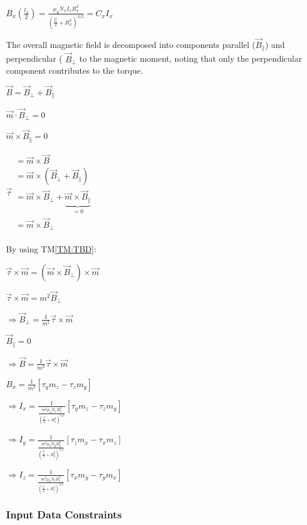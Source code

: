 \documentclass[12pt]{article}
\newcommand{\tref}[1]{TM\ref{#1}}
\begin{document}
$B_x\left( \frac{l_x}{2} \right) =\frac{\mu _0N_xI_xR_{x}^{2}}{\left( \frac{l_{x}^{2}}{4}+R_{x}^{2} \right) ^{3/2}}=C_xI_x$

The overall magnetic field is decomposed into components parallel ($\vec{B}_{\parallel}$) and perpendicular ( $\vec{B}_{\bot}$ to the magnetic moment, noting that only the perpendicular component contributes to the torque. 

$\vec{B}=\vec{B}_{\bot}+\vec{B}_{\parallel}$

$\vec{m}\cdot \vec{B}_{\bot}=0$

$\vec{m}\times \vec{B}_{\parallel}=0$

$\vec{\tau}\begin{array}{l}
 =\vec{m}\times \vec{B}\\
 =\vec{m}\times \left( \vec{B}_{\bot}+\vec{B}_{\parallel} \right)\\
 =\vec{m}\times \vec{B}_{\bot}+\underset{=0}{\underbrace{\vec{m}\times \vec{B}_{\parallel}}}\\
 =\vec{m}\times \vec{B}_{\bot}\\
\end{array}$

By using \tref{TM:TBD}:

$\vec{\tau}\times \vec{m}=\left( \vec{m}\times \vec{B}_{\bot} \right) \times \vec{m}$

$\vec{\tau}\times \vec{m}=m^2\vec{B}_{\bot}$

$\Rightarrow \vec{B}_{\bot}=\frac{1}{m^2}\vec{\tau}\times \vec{m}$

$\vec{B}_{\parallel}=0$

$\Rightarrow \vec{B}=\frac{1}{m^2}\vec{\tau}\times \vec{m}$

$B_x=\frac{1}{m^2}\left[ \tau _ym_z-\tau _zm_y \right] $

$\Rightarrow I_x=\frac{1}{\frac{m^2\mu _0N_xR_{x}^{2}}{\left( \frac{l_{x}^{2}}{4}+R_{x}^{2} \right) ^{3/2}}}\left[ \tau _ym_z-\tau _zm_y \right] $

$\Rightarrow I_y=\frac{1}{\frac{m^2\mu _0N_yR_{y}^{2}}{\left( \frac{l_{y}^{2}}{4}+R_{y}^{2} \right) ^{3/2}}}\left[ \tau _zm_x-\tau _xm_z \right] $

$\Rightarrow I_z=\frac{1}{\frac{m^2\mu _0N_zR_{z}^{2}}{\left( \frac{l_{z}^{2}}{4}+R_{z}^{2} \right) ^{3/2}}}\left[ \tau _xm_y-\tau _ym_x \right] $


\subsubsection{Input Data Constraints} \label{sec_DataConstraints}    
\end{document}
